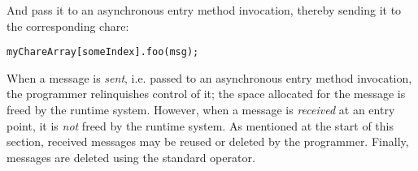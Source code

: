 And pass it to an asynchronous entry method invocation, thereby sending it to the 
corresponding chare:

\begin{alltt}
myChareArray[someIndex].foo(msg);
\end{alltt}

When a message  is {\em sent}, i.e.  passed to an asynchronous
entry method invocation, the programmer relinquishes control of it; the space
allocated for the message is freed by the runtime system.  However, when a
message is {\em received} at an entry point, it is {\em not} freed by the
runtime system.  As mentioned at the start of this section, received
messages may be reused or deleted by the programmer.  Finally, messages are
deleted using the standard \CC{}  operator.  

